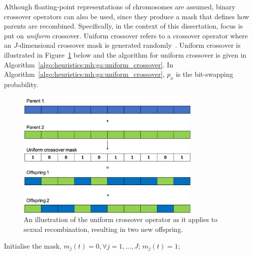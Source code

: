 Although floating-point representations of chromosomes are assumed, binary crossover operators can also be used, since they produce a mask that defines how parents are recombined. Specifically, in the context of this dissertation, focus is put on \textit{uniform} crossover. Uniform crossover refers to a crossover operator where an $J$-dimensional crossover mask is generated randomly~\cite{ref:syswerda:1989}. Uniform crossover is illustrated in Figure~\ref{fig:heuristics:mh:ga:uniform_crossover} below and the algorithm for uniform crossover is given in Algorithm~\ref{algo:heuristics:mh:ga:uniform_crossover}. In Algorithm~\ref{algo:heuristics:mh:ga:uniform_crossover}, $p_{x}$ is the bit-swapping probability.


\begin{figure}[htbp]
	\centering
	\includegraphics[width=0.8\textwidth]{images/uniform_crossover.pdf}
	\caption{An illustration of the uniform crossover operator as it applies to sexual recombination, resulting in two new offspring.}
	\label{fig:heuristics:mh:ga:uniform_crossover}
\end{figure}


\begin{algorithm}[htb]
	\caption{The pseudo-code for the uniform crossover operator as used by \acp{GA}.}
	\label{algo:heuristics:mh:ga:uniform_crossover}
	\begin{algorithmic}
		\State Initialise the mask, $m_{j}(t) = 0, \forall j = 1, \dots, J$;
		\State $m_{j}(t) = 1$;
		\EndIf
		\EndFor
		\State
	\end{algorithmic}
\end{algorithm}


